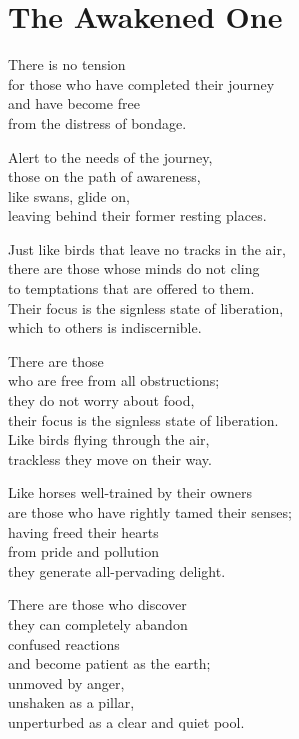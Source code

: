 
\chapter{The Awakened One}


There is no tension\\
for those who have completed their journey\\
and have become free\\
from the distress of bondage.


Alert to the needs of the journey,\\
those on the path of awareness,\\
like swans, glide on,\\
leaving behind their former resting places.


Just like birds that leave no tracks in the air,\\
there are those whose minds do not cling\\
to temptations that are offered to them.\\
Their focus is the signless state of liberation,\\
which to others is indiscernible.


There are those\\
who are free from all obstructions;\\
they do not worry about food,\\
their focus is the signless state of liberation.\\
Like birds flying through the air,\\
trackless they move on their way.


Like horses well-trained by their owners\\
are those who have rightly tamed their senses;\\
having freed their hearts\\
from pride and pollution\\
they generate all-pervading delight.


There are those who discover\\
they can completely abandon\\
confused reactions\\
and become patient as the earth;\\
unmoved by anger,\\
unshaken as a pillar,\\
unperturbed as a clear and quiet pool.



